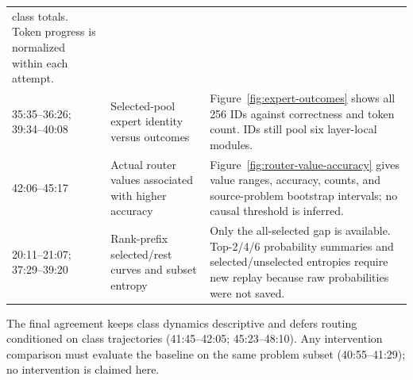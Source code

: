 \begin{longtable}{@{}p{.14\linewidth}p{.29\linewidth}p{.49\linewidth}@{}}
class totals. Token progress is normalized within each attempt. \\
35:35--36:26; 39:34--40:08 & Selected-pool expert identity versus outcomes &
Figure~\ref{fig:expert-outcomes} shows all 256 IDs against correctness and
token count. IDs still pool six layer-local modules. \\
42:06--45:17 & Actual router values associated with higher accuracy &
Figure~\ref{fig:router-value-accuracy} gives value ranges, accuracy, counts,
and source-problem bootstrap intervals; no causal threshold is inferred. \\
20:11--21:07; 37:29--39:20 & Rank-prefix selected/rest curves and subset entropy &
Only the all-selected gap is available. Top-2/4/6 probability summaries and
selected/unselected entropies require new replay because raw probabilities
were not saved. \\
\end{longtable}
\endgroup

The final agreement keeps class dynamics descriptive and defers routing
conditioned on class trajectories (41:45--42:05; 45:23--48:10).
Any intervention comparison must evaluate the baseline on the same problem
subset (40:55--41:29); no intervention is claimed here.
